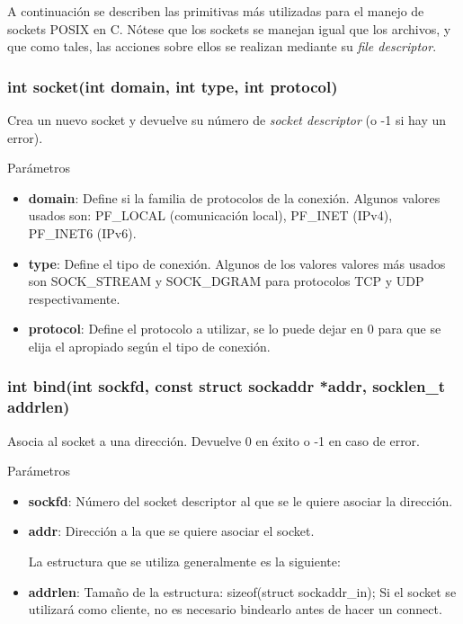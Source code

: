 \documentclass[a4paper, twoside]{article}
\newcommand{\codedir}{../resources/code} %
\begin{document}
A continuación se describen las primitivas más utilizadas para el manejo de sockets POSIX en C. Nótese que los sockets se manejan igual que los archivos, y que como tales, las acciones sobre ellos se realizan mediante su \emph{file descriptor}.

\subsubsection{int socket(int domain, int type, int protocol)}
Crea un nuevo socket y devuelve su número de \emph{socket descriptor} (o -1 si hay un error).

\begin{parametros*}{Parámetros}
	\begin{itemize}
		\item \textbf{domain}: Define si la familia de protocolos de la conexión. Algunos valores usados son: PF\_LOCAL (comunicación local), PF\_INET (IPv4), PF\_INET6 (IPv6).
		\item \textbf{type}: Define el tipo de conexión. Algunos de los valores valores más usados son SOCK\_STREAM y SOCK\_DGRAM para protocolos TCP y UDP respectivamente.
		\item \textbf{protocol}: Define el protocolo a utilizar, se lo puede dejar en 0 para que se elija el apropiado según el tipo de conexión.
	\end{itemize}
\end{parametros*}

\subsubsection{int bind(int sockfd, const struct sockaddr *addr, socklen\_t addrlen)}
Asocia al socket a una dirección. Devuelve 0 en éxito o -1 en caso de error.

\begin{parametros*}{Parámetros}
	\begin{itemize}
		\item \textbf{sockfd}: Número del socket descriptor al que se le quiere asociar la dirección.
		\item \textbf{addr}: Dirección a la que se quiere asociar el socket.
		
		La estructura que se utiliza generalmente es la siguiente:

		
		
		\item \textbf{addrlen}: Tamaño de la estructura: sizeof(struct sockaddr\_in);
		Si el socket se utilizará como cliente, no es necesario bindearlo antes de hacer un connect.
	\end{itemize}
\end{parametros*}
\end{document}
